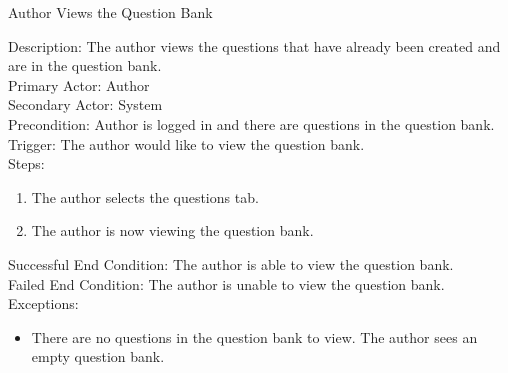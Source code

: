     \begin{section}{Author Views the Question Bank}
    
Description: The author views the questions that have already been created and are in the question bank.\\
Primary Actor: Author\\
Secondary Actor: System \\
Precondition: Author is logged in and there are questions in the question bank.\\
Trigger: The author would like to view the question bank.\\
Steps:
\begin{enumerate}
\item The author selects the questions tab.
\item The author is now viewing the question bank.

\end{enumerate}

Successful End Condition: The author is able to view the question bank.\\
Failed End Condition: The author is unable to view the question bank.\\
Exceptions:
\begin{itemize}
\item There are no questions in the question bank to view. The author sees an empty question bank.
\end{itemize}
    \end{section}
    
    
    
